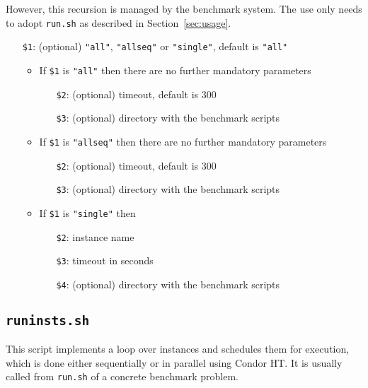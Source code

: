 \documentclass[a4paper]{article}
\begin{document}
		    However, this recursion is managed by the benchmark system.
		    The use only needs to adopt {\tt run.sh} as described in Section~\ref{sec:usage}.
		
		    \medskip{}
		    \begin{itemize}
				\item[{\tt \$1}:] (optional) {\tt "all"}, {\tt "allseq"} or {\tt "single"}, default is {\tt "all"}
					\begin {itemize}
						\item If {\tt \$1} is {\tt "all"} then there are no further mandatory parameters
							\begin{itemize}
								\item[{\tt \$2}:] (optional) timeout, default is $300$
								\item[{\tt \$3}:] (optional) directory with the benchmark scripts
							\end{itemize}
						\item If {\tt \$1} is {\tt "allseq"} then there are no further mandatory parameters
							\begin{itemize}
								\item[{\tt \$2}:] (optional) timeout, default is $300$
								\item[{\tt \$3}:] (optional) directory with the benchmark scripts
							\end{itemize}
						\item If {\tt \$1} is {\tt "single"} then
							\begin{itemize}
								\item[{\tt \$2}:] instance name
								\item[{\tt \$3}:] timeout in seconds
								\item[{\tt \$4}:] (optional) directory with the benchmark scripts
							\end{itemize}
					\end{itemize}
		    \end{itemize}
				
		\subsection{\tt runinsts.sh}
		
		    This script implements a loop over instances and schedules them for execution,
		    which is done either sequentially or in parallel using Condor HT.
		    It is usually called from {\tt run.sh} of a concrete benchmark problem.
		    
\end{document}
